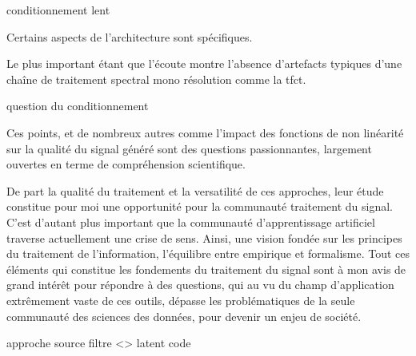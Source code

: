conditionnement lent

Certains aspects de l'architecture sont spécifiques.

Le plus important étant que l'écoute montre l'absence d'artefacts typiques d'une chaîne de traitement spectral mono résolution comme la tfct.

question du conditionnement



Ces points, et de nombreux autres comme l'impact des fonctions de non linéarité sur la qualité du signal généré sont des questions passionnantes, largement ouvertes en terme de compréhension scientifique.

De part la qualité du traitement et la versatilité de ces approches, leur étude constitue pour moi une opportunité pour la communauté traitement du signal. C'est d'autant plus important que la communauté d'apprentissage artificiel traverse actuellement une crise de sens. Ainsi, une vision fondée sur les principes du traitement de l'information, l'équilibre entre empirique et formalisme. Tout ces éléments qui constitue les fondements du traitement du signal sont à mon avis de grand intérêt pour répondre à des questions, qui au vu du champ d'application extrêmement vaste de ces outils, dépasse les problématiques de la seule communauté des sciences des données, pour devenir un enjeu de société.


approche source filtre <> latent code
